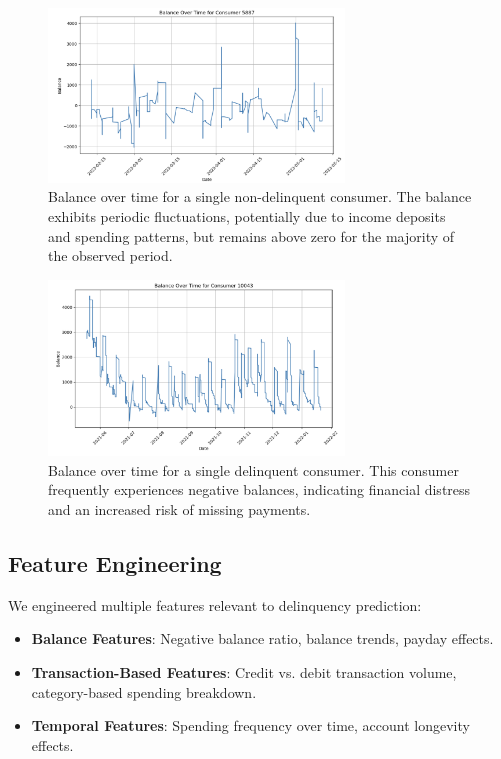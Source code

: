 \documentclass[12pt,letterpaper]{article}
\begin{document}
\begin{figure}[H]
    \centering
    \includegraphics[width=0.7\textwidth]{figure/balance_single_non_delinquent.png}
    \caption{Balance over time for a single non-delinquent consumer. The balance exhibits periodic fluctuations, potentially due to income deposits and spending patterns, but remains above zero for the majority of the observed period.}
    \label{fig:balance_single_non_delinquent}
\end{figure}

\begin{figure}[H]
    \centering
    \includegraphics[width=0.7\textwidth]{figure/balance_single_delinquent.png}
    \caption{Balance over time for a single delinquent consumer. This consumer frequently experiences negative balances, indicating financial distress and an increased risk of missing payments.}
    \label{fig:balance_single_delinquent}
\end{figure}


\subsection{Feature Engineering}
We engineered multiple features relevant to delinquency prediction:
\begin{itemize}
    \item \textbf{Balance Features}: Negative balance ratio, balance trends, payday effects.
    \item \textbf{Transaction-Based Features}: Credit vs. debit transaction volume, category-based spending breakdown.
    \item \textbf{Temporal Features}: Spending frequency over time, account longevity effects.
\end{itemize}
\end{document}
